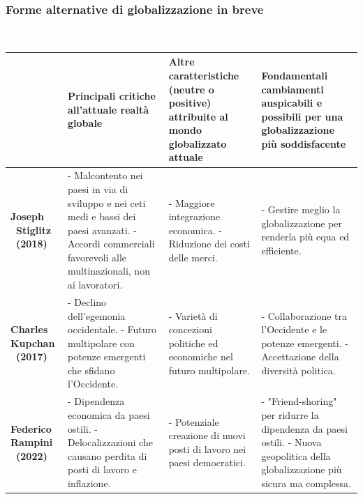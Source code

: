 \documentclass{article}
\begin{document}
\subsubsection{Forme alternative di globalizzazione in breve}
\phantom{}\\
\begin{table}[ht!]
    \centering
    \renewcommand{\arraystretch}{1.5}
    \begin{tabular}{| m{2cm} | m{4cm} | m{4cm} | m{4cm} |}
    \hline
    \textbf{} & \textbf{Principali critiche all’attuale realtà globale} & \textbf{Altre caratteristiche (neutre o positive) attribuite al mondo globalizzato attuale} & \textbf{Fondamentali cambiamenti auspicabili e possibili per una globalizzazione più soddisfacente} \\
    \hline
    \textbf{Joseph \ Stiglitz \ (2018)} & 
    - Malcontento nei paesi in via di sviluppo e nei ceti medi e bassi dei paesi avanzati. \newline
    - Accordi commerciali favorevoli alle multinazionali, non ai lavoratori. & 
    - Maggiore integrazione economica. \newline
    - Riduzione dei costi delle merci. & 
    - Gestire meglio la globalizzazione per renderla più equa ed efficiente. \\
    \hline
    \textbf{Charles Kupchan \ (2017)} & 
    - Declino dell'egemonia occidentale. \newline
    - Futuro multipolare con potenze emergenti che sfidano l'Occidente. & 
    - Varietà di concezioni politiche ed economiche nel futuro multipolare. & 
    - Collaborazione tra l'Occidente e le potenze emergenti. \newline
    - Accettazione della diversità politica. \\
    \hline
    \textbf{Federico Rampini \ (2022)} & 
    - Dipendenza economica da paesi ostili. \newline
    - Delocalizzazioni che causano perdita di posti di lavoro e inflazione. & 
    - Potenziale creazione di nuovi posti di lavoro nei paesi democratici. & 
    - "Friend-shoring" per ridurre la dipendenza da paesi ostili. \newline
    - Nuova geopolitica della globalizzazione più sicura ma complessa. \\
    \hline
    \end{tabular}
\end{table}
\end{document}
